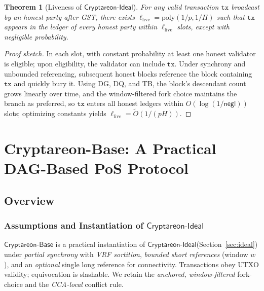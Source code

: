 \documentclass[11pt]{article}
\newtheorem{theorem}{Theorem}[section]
\newcommand{\ProjIdeal}{\ensuremath{\mathsf{Cryptareon\text{-}Ideal}}\xspace}
\newcommand{\ProjBase}{\ensuremath{\mathsf{Cryptareon\text{-}Base}}\xspace}
\newcommand{\negl}{\ensuremath{\mathsf{negl}}\xspace}
\newcommand{\tx}{\ensuremath{\mathtt{tx}}\xspace}
\begin{document}
\begin{theorem}[Liveness of \ProjIdeal]
\label{thm:ideal-liveness}
For any valid transaction $\tx$ broadcast by an honest party after GST, there exists $\ell_{\mathrm{live}}=\mathrm{poly}(1/p,1/H)$ such that $\tx$ appears in the ledger of every honest party within $\ell_{\mathrm{live}}$ slots, except with negligible probability.
\end{theorem}
\begin{proof}[Proof sketch]
In each slot, with constant probability at least one honest validator is eligible; upon eligibility, the validator can include $\tx$. Under synchrony and unbounded referencing, subsequent honest blocks reference the block containing $\tx$ and quickly bury it. Using DG, DQ, and TB, the block's descendant count grows linearly over time, and the window-filtered fork choice maintains the branch as preferred, so $\tx$ enters all honest ledgers within $O(\log(1/\negl))$ slots; optimizing constants yields $\ell_{\mathrm{live}}=\tilde{O}(1/(pH))$.
\end{proof}

\section{Cryptareon-Base: A Practical DAG-Based PoS Protocol}
\label{sec:cryptareon-base}

\subsection{Overview}  

\subsubsection{Assumptions and Instantiation of \ProjIdeal}
\label{subsec:base-overview}
\ProjBase is a practical instantiation of \ProjIdeal (Section~\ref{sec:ideal}) under \emph{partial synchrony} with \emph{VRF sortition}, \emph{bounded short references} (window $w$), and an \emph{optional} single long reference for connectivity. Transactions obey UTXO validity; equivocation is slashable. We retain the \emph{anchored, window-filtered} fork-choice and the \emph{CCA-local} conflict rule.
\end{document}
